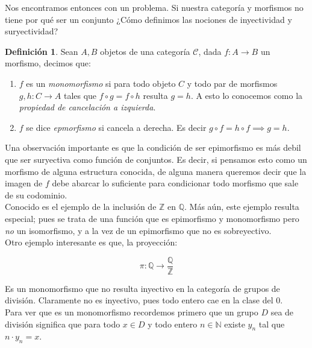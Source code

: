 \documentclass{article}
\newcommand{\nat}{\ensuremath{\mathbb{N}}}
\newcommand{\Q}{\ensuremath{\mathbb{Q}}}
\newcommand{\Z}{\ensuremath{\mathds{Z}}}
\theoremstyle{plain}
\theoremstyle{definition}
\newtheorem{definition}[theorem]{Definición}
\theoremstyle{remark}
\begin{document}
Nos encontramos entonces con un problema. Si nuestra categoría y morfismos no tiene por qué ser un conjunto ¿Cómo definimos las nociones de inyectividad y suryectividad?

\begin{definition}
    Sean $A,B$ objetos de una categoría $\mathcal{C}$, dada $f:A \to B$ un morfismo, decimos que:

    \begin{enumerate}
        \item $f$ es un \textit{monomorfismo} si para todo objeto $C$ y todo par de morfismos $g,h:C \to A$ tales que $f \circ g =f \circ h$ resulta $g = h$. A esto lo conocemos como la \textit{propiedad de cancelación a izquierda}.

        \item $f$ se dice \textit{epmorfismo} si cancela a derecha. Es decir $g \circ f = h \circ f \implies g = h$.
    \end{enumerate}
\end{definition}

Una observación importante es que la condición de ser epimorfismo es más debil que ser suryectiva como función de conjuntos. Es decir, si pensamos esto como un morfismo de alguna estructura conocida, de alguna manera queremos decir que la imagen de $f$ debe abarcar lo suficiente para condicionar todo morfismo que sale de su codominio.  \\

Conocido es el ejemplo de la inclusión de $\mathbb{Z}$ en $\mathbb{Q}$. Más aún, este ejemplo resulta especial; pues se trata de una función que es epimorfismo y monomorfismo pero \textit{no} un isomorfismo, y a la vez de un epimorfismo que no es sobreyectivo. \\

Otro ejemplo interesante es que, la proyección:

\begin{equation*}
    \pi: \mathbb{Q} \to \frac{\Q}{\Z}
\end{equation*}

Es un monomorfismo que no resulta inyectivo en la categoría de grupos de división. Claramente no es inyectivo, pues todo entero cae en la clase del $0$. \\

Para ver que es un monomorfismo recordemos primero que un grupo $D$ sea de división significa que para todo $x \in D$ y todo entero $n \in \nat$ existe $y_n$ tal que $n \cdot y_n = x$. \\
\end{document}
